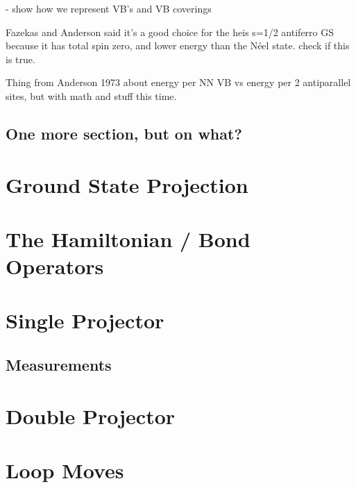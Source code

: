 - show how we represent VB's and VB coverings

{\color{red} Fazekas and Anderson said it's a good choice for the heis s=1/2 antiferro GS
because it has total spin zero, and lower energy than the N\'eel state.  check if this is true.}

{\color{red} Thing from Anderson 1973 about energy per NN VB vs energy per 2 antiparallel sites,
but with math and stuff this time.}

\subsection{One more section, but on what?}


\section{Ground State Projection}
\section{The Hamiltonian / Bond Operators}
\section{Single Projector}
\subsection{Measurements}
\section{Double Projector}
\section{Loop Moves}
